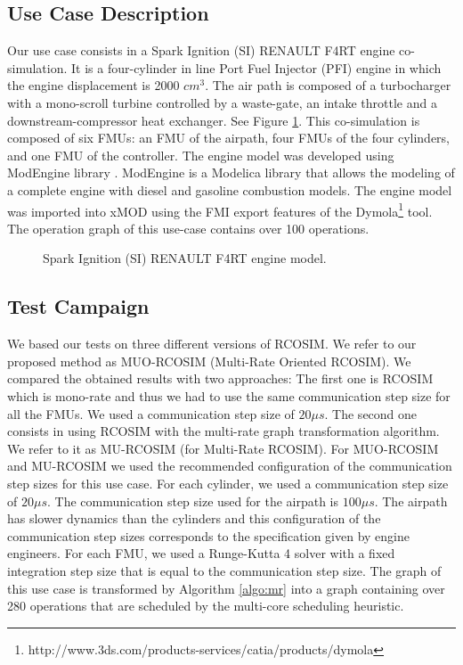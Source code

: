 \subsection{Use Case Description}

Our use case consists in a Spark Ignition (SI) RENAULT F4RT engine co-simulation. It is a four-cylinder in line Port Fuel Injector (PFI) engine in which the engine displacement is 2000 $cm^3$. The air path is composed of a turbocharger with a mono-scroll turbine controlled by a waste-gate, an intake throttle and a downstream-compressor heat exchanger. See Figure \ref{fig:use_case}. This co-simulation is composed of six FMUs: an FMU of the airpath, four FMUs of the four cylinders, and one FMU of the controller.
The engine model was developed using ModEngine library \cite{benjelloun:2011}. ModEngine is a Modelica library that allows the modeling of a complete engine with diesel and gasoline combustion models. The engine model was imported into xMOD using the FMI export features of the Dymola\footnote{http://www.3ds.com/products-services/catia/products/dymola} tool. The operation graph of this use-case contains over 100 operations.

\begin{figure}[phbt]
\centering

\caption{Spark Ignition (SI) RENAULT F4RT engine model.}
\label{fig:use_case}
\end{figure}

\subsection{Test Campaign}

We based our tests on three different versions of RCOSIM. We refer to our proposed method as MUO-RCOSIM (Multi-Rate Oriented RCOSIM). We compared the obtained results with two approaches: The first one is RCOSIM which is mono-rate and thus we had to use the same communication step size for all the FMUs. We used a communication step size of $20 {\mu}s$. The second one consists in using RCOSIM with the multi-rate graph transformation algorithm. We refer to it as MU-RCOSIM (for Multi-Rate RCOSIM). For MUO-RCOSIM and MU-RCOSIM we used the recommended configuration of the communication step sizes for this use case. For each cylinder, we used a communication step size of $20 {\mu}s$. The communication step size used for the airpath is $100 {\mu}s$. The airpath has slower dynamics than the cylinders and this configuration of the communication step sizes corresponds to the specification given by engine engineers. For each FMU, we used a Runge-Kutta 4 solver with a fixed integration step size that is equal to the communication step size. The graph of this use case is transformed by Algorithm \ref{algo:mr} into a graph containing over 280 operations that are scheduled by the multi-core scheduling heuristic.      

